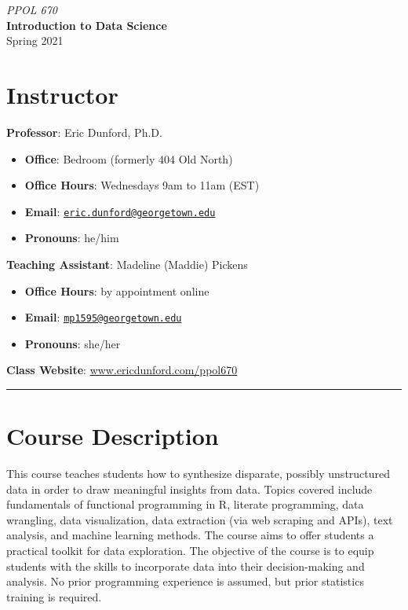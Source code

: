 \documentclass[
  12pt,
]{article}
\author{}
\date{\vspace{-2.5em}}
\providecommand{\tightlist}{%
  \setlength{\itemsep}{0pt}\setlength{\parskip}{0pt}}
\begin{document}
\begin{center}
 

\huge \textit{PPOL 670}\\
\huge\textbf{Introduction to Data Science}\\

\Large Spring 2021
\end{center}

\hypertarget{instructor}{%
\section{Instructor}\label{instructor}}

\textbf{Professor}: Eric Dunford, Ph.D.

\begin{itemize}
\tightlist
\item
  \textbf{Office}: Bedroom (formerly 404 Old North)
\item
  \textbf{Office Hours}: Wednesdays 9am to 11am (EST)
\item
  \textbf{Email}:
  \href{mailto:eric.dunford@georgetown.edu}{\nolinkurl{eric.dunford@georgetown.edu}}
\item
  \textbf{Pronouns}: he/him
\end{itemize}

\textbf{Teaching Assistant}: Madeline (Maddie) Pickens

\begin{itemize}
\tightlist
\item
  \textbf{Office Hours}: by appointment online
\item
  \textbf{Email}:
  \href{mailto:mp1595@georgetown.edu}{\nolinkurl{mp1595@georgetown.edu}}
\item
  \textbf{Pronouns}: she/her
\end{itemize}

\textbf{Class Website}: \url{www.ericdunford.com/ppol670}

\begin{center}\rule{0.5\linewidth}{0.5pt}\end{center}

\hypertarget{course-description}{%
\section{Course Description}\label{course-description}}

This course teaches students how to synthesize disparate, possibly
unstructured data in order to draw meaningful insights from data. Topics
covered include fundamentals of functional programming in R, literate
programming, data wrangling, data visualization, data extraction (via
web scraping and APIs), text analysis, and machine learning methods. The
course aims to offer students a practical toolkit for data exploration.
The objective of the course is to equip students with the skills to
incorporate data into their decision-making and analysis. No prior
programming experience is assumed, but prior statistics training is
required.
\end{document}
